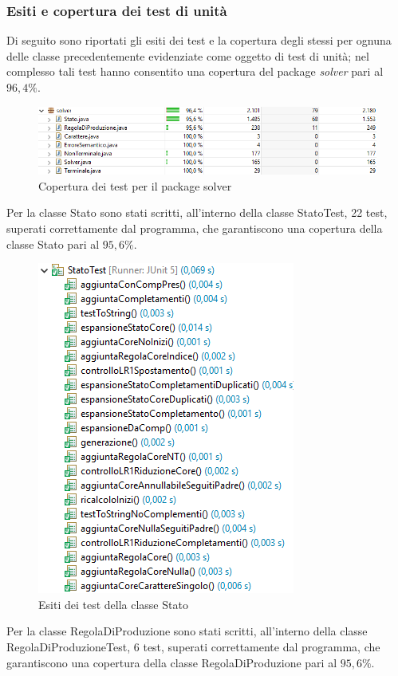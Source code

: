 \documentclass[12pt]{article}
\newcounter{subsubsubsection}[subsubsection]
\begin{document}
\subsubsection{Esiti e copertura dei test di unità}
Di seguito sono riportati gli esiti dei test e la copertura degli stessi per ognuna delle classe precedentemente evidenziate come oggetto di test di unità; nel complesso tali test hanno consentito una copertura del package \textit{solver} pari al $96,4\%$.
\begin{figure}[h]
\centering
\includegraphics[width=\textwidth]{immagini/V1SolverCoverage.png}
\caption{Copertura dei test per il package solver}
\end{figure}
Per la classe Stato sono stati scritti, all'interno della classe StatoTest, 22 test, superati correttamente dal programma, che garantiscono una copertura della classe Stato pari al $95,6\%$.
\begin{figure}[h]
\centering
\includegraphics[scale=0.9]{immagini/V1esitiStatoTest.png}
\caption{Esiti dei test della classe Stato}
\end{figure}
Per la classe RegolaDiProduzione sono stati scritti, all'interno della classe RegolaDiProduzioneTest, 6 test, superati correttamente dal programma, che garantiscono una copertura della classe RegolaDiProduzione pari al $95,6\%$.
\end{document}
